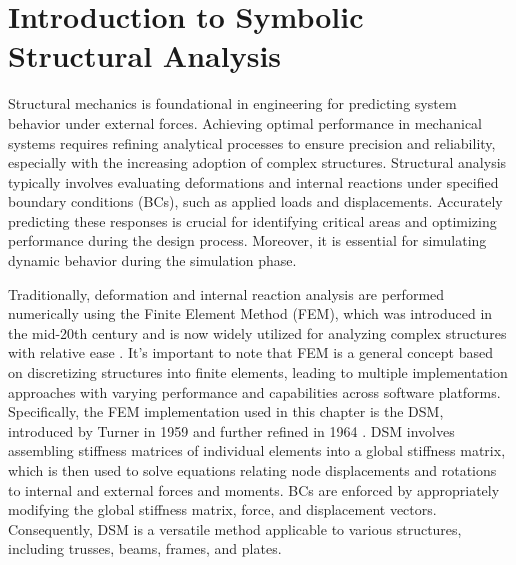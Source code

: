 
\section{Introduction to Symbolic Structural Analysis}
\label{app4:sec:introduction}

Structural mechanics is foundational in engineering for predicting system behavior under external forces. Achieving optimal performance in mechanical systems requires refining analytical processes to ensure precision and reliability, especially with the increasing adoption of complex structures. Structural analysis typically involves evaluating deformations and internal reactions under specified boundary conditions (\acp{BC}), such as applied loads and displacements. Accurately predicting these responses is crucial for identifying critical areas and optimizing performance during the design process. Moreover, it is essential for simulating dynamic behavior during the simulation phase.

Traditionally, deformation and internal reaction analysis are performed numerically using the Finite Element Method (\ac{FEM}), which was introduced in the mid-20th century and is now widely utilized for analyzing complex structures with relative ease \cite{felippa2001historical}. It's important to note that \ac{FEM} is a general concept based on discretizing structures into finite elements, leading to multiple implementation approaches with varying performance and capabilities across software platforms. Specifically, the \ac{FEM} implementation used in this chapter is the \ac{DSM}, introduced by Turner in 1959 \cite{turner1959direct} and further refined in 1964 \cite{turner1964further}. DSM involves assembling stiffness matrices of individual elements into a global stiffness matrix, which is then used to solve equations relating node displacements and rotations to internal and external forces and moments. \acp{BC} are enforced by appropriately modifying the global stiffness matrix, force, and displacement vectors. Consequently, DSM is a versatile method applicable to various structures, including trusses, beams, frames, and plates.

